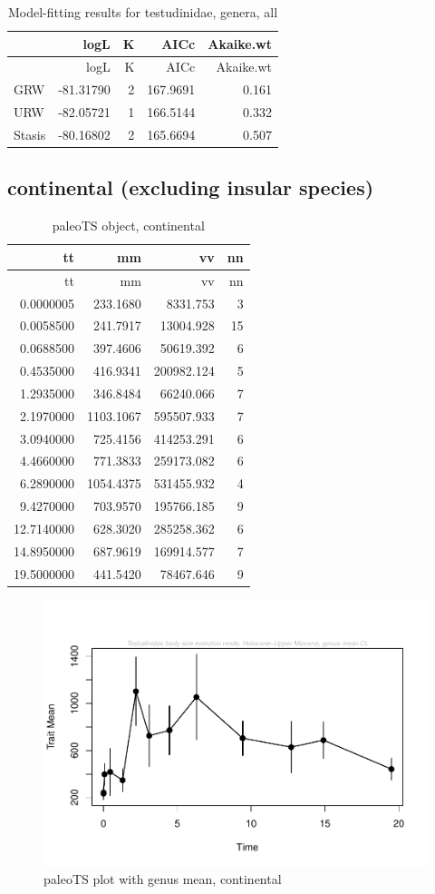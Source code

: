 \begin{longtable}[]{@{}lrrrr@{}}
	\caption{Model-fitting results for testudinidae, genera,
		all}
	\label{tab:pTSallEM}\tabularnewline
	\toprule
	& logL & K & AICc & Akaike.wt\tabularnewline
	\midrule
	\endfirsthead
	\toprule
	& logL & K & AICc & Akaike.wt\tabularnewline
	\midrule
	\endhead
	GRW & -81.31790 & 2 & 167.9691 & 0.161\tabularnewline
	URW & -82.05721 & 1 & 166.5144 & 0.332\tabularnewline
	Stasis & -80.16802 & 2 & 165.6694 & 0.507\tabularnewline
	\bottomrule
\end{longtable}

\FloatBarrier

\subsection{continental (excluding insular
	species)}\label{continental-excluding-insular-species}


\begin{longtable}[]{@{}rrrr@{}}
	\caption{paleoTS object, continental}
	\label{tab:pTSC}\tabularnewline
	\toprule
	tt & mm & vv & nn\tabularnewline
	\midrule
	\endfirsthead
	\toprule
	tt & mm & vv & nn\tabularnewline
	\midrule
	\endhead
	0.0000005 & 233.1680 & 8331.753 & 3\tabularnewline
	0.0058500 & 241.7917 & 13004.928 & 15\tabularnewline
	0.0688500 & 397.4606 & 50619.392 & 6\tabularnewline
	0.4535000 & 416.9341 & 200982.124 & 5\tabularnewline
	1.2935000 & 346.8484 & 66240.066 & 7\tabularnewline
	2.1970000 & 1103.1067 & 595507.933 & 7\tabularnewline
	3.0940000 & 725.4156 & 414253.291 & 6\tabularnewline
	4.4660000 & 771.3833 & 259173.082 & 6\tabularnewline
	6.2890000 & 1054.4375 & 531455.932 & 4\tabularnewline
	9.4270000 & 703.9570 & 195766.185 & 9\tabularnewline
	12.7140000 & 628.3020 & 285258.362 & 6\tabularnewline
	14.8950000 & 687.9619 & 169914.577 & 7\tabularnewline
	19.5000000 & 441.5420 & 78467.646 & 9\tabularnewline
	\bottomrule
\end{longtable}

\begin{figure}[htbp]
	\centering
	\includegraphics{MA_JJ_files/figure-latex/paleoTSC-1.pdf}
	\caption{paleoTS plot with genus mean, continental}
	\label{fig:pTSC}
\end{figure}

